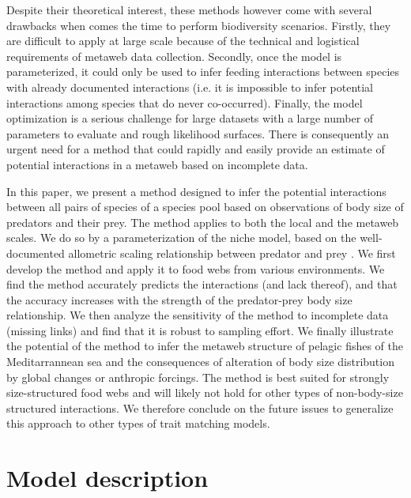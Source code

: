 \documentclass[12pt]{article}
\begin{document}
Despite their theoretical interest, these methods however come with several
drawbacks when comes the time to perform biodiversity scenarios. Firstly, they
are difficult to apply at large scale because of the technical and logistical
requirements of metaweb data collection. Secondly, once the model is
parameterized, it could only be used to infer feeding interactions between
species with already documented interactions (i.e. it is impossible to infer
potential interactions among species that do never co-occurred). Finally, the
model optimization is a serious challenge for large datasets with a large number
of parameters to evaluate and rough likelihood surfaces. There is consequently
an urgent need for a method that could rapidly and easily provide an estimate of
potential interactions in a metaweb based on incomplete data.

In this paper, we present a method designed to infer the potential interactions
between all pairs of species of a species pool based on observations of body
size of predators and their prey. The method applies to both the local and the
metaweb scales. We do so by a parameterization of the niche model, based on the
well-documented allometric scaling relationship between predator and prey
\parencite{Cohen2003, Brose2006, Riede2010}. We first develop the method and
apply it to food webs from various environments. We find the method accurately
predicts the interactions (and lack thereof), and that the accuracy increases
with the strength of the predator-prey body size relationship. We then analyze
the sensitivity of the method to incomplete data (missing links) and find that
it is robust to sampling effort. We finally illustrate the potential of the
method to infer the metaweb structure of pelagic fishes of the Meditarrannean
sea and the consequences of alteration of body size distribution by global
changes or anthropic forcings. The method is best suited for strongly
size-structured food webs and will likely not hold for other types of
non-body-size structured interactions. We therefore conclude on the future
issues to generalize this approach to other types of trait matching models.

\section{Model description}
\end{document}
